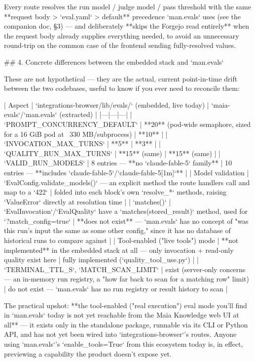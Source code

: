 Every route resolves the run model / judge model / pass threshold with the same **request body > `eval.yaml` > default** precedence `man.evals` uses (see the companion doc, §3) — and deliberately **skips the Forgejo read entirely** when the request body already supplies everything needed, to avoid an unnecessary round-trip on the common case of the frontend sending fully-resolved values.

## 4. Concrete differences between the embedded stack and `man.evals`

These are not hypothetical — they are the actual, current point-in-time drift between the two codebases, useful to know if you ever need to reconcile them:

| Aspect | `integrations-browser/lib/evals/` (embedded, live today) | `maia-evals`/`man.evals` (extracted) |
|---|---|---|
| `PROMPT_CONCURRENCY_DEFAULT` | **20** (pod-wide semaphore, sized for a 16 GiB pod at ~330 MB/subprocess) | **10** |
| `INVOCATION_MAX_TURNS` | **5** | **3** |
| `QUALITY_RUN_MAX_TURNS` | **15** (same) | **15** (same) |
| `VALID_RUN_MODELS` | 8 entries — **no `claude-fable-5` family** | 10 entries — **includes `claude-fable-5`/`claude-fable-5[1m]`** |
| Model validation | `EvalConfig.validate_models()` — an explicit method the route handlers call and map to a `422` | folded into each block's own `resolve_*` methods, raising `ValueError` directly at resolution time |
| `matches()` | `EvalInvocation`/`EvalQuality` have a `matches(stored_result)` method, used for `?match_config=true` | **does not exist** — `man.evals` has no concept of "was this run's input the same as some other config," since it has no database of historical runs to compare against |
| Tool-enabled ("live tools") mode | **not implemented** in the embedded stack at all — only invocation + read-only quality exist here | fully implemented (`quality_tool_use.py`) |
| `TERMINAL_TTL_S`, `MATCH_SCAN_LIMIT` | exist (server-only concerns — an in-memory run registry, a "how far back to scan for a matching row" limit) | do not exist — `man.evals` has no run registry or result history to scan |

The practical upshot: **the tool-enabled ("real execution") eval mode you'll find in `man.evals` today is not yet reachable from the Maia Knowledge web UI at all** — it exists only in the standalone package, runnable via its CLI or Python API, and has not yet been wired into `integrations-browser`'s routes. Anyone using `man.evals`'s `enable_tools=True` from this ecosystem today is, in effect, previewing a capability the product doesn't expose yet.

